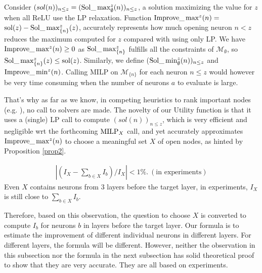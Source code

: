 Consider $(sol(n))_{n \leq z} = (\mathrm{Sol}\_\max_\emptyset^z(n))_{n \leq z}$, a solution maximizing the value for $z$ when all ReLU use the LP relaxation.
Function
$\mathrm{Improve}\_\max^z(n)=$ $\mathrm{sol}(z) - \mathrm{Sol}\_\max_{\{n\}}^z(z)$, 
accurately represents how much opening neuron $n < z$ reduces the maximum computed for $z$
compared with using only LP. 
We have $\mathrm{Improve}\_\max^z(n)\geq 0$ as $\mathrm{Sol}\_\max_{\{n\}}^z$ fulfills all the constraints of 
$\mathcal{M}_\emptyset$, so $\mathrm{Sol}\_\max_{\{n\}}^z(z) \leq \mathrm{sol}(z)$.
Similarly, we define ($\mathrm{Sol}\_\min_\emptyset^z(n))_{n \leq z}$ and 
$\mathrm{Improve}\_\min^z(n)$. Calling MILP on $\mathcal{M}_{\{n\}}$ for each neuron $n \leq z$
would however be very time consuming when the number of neurons $a$ to evaluate is large.
{\color{blue} 
That's why as far as we know, in competing heuristics to rank important nodes (e.g. \cite{huang2017safety,crown}), no call to solvers are made.
The novelty of our Utility function is that it uses a (single) LP call to compute $(sol(n))_{n \leq z}$, which is very efficient and negligible wrt the forthcoming  ${\textrm{MILP}}_X$ call, and yet accurately approximates $\mathrm{Improve}\_\max^z(n)$ to choose a meaningful set $X$ of open nodes, as hinted by Proposition \ref{prop2}.








\iffalse
\begin{align*}
	|(I_X - \sum_{b\in X} I_b)/I_X| < 1\%. \ (\text{in experiments})
\end{align*} Even $X$ contains neurons from 3 layers before the target layer, in experiments, $I_X$ is still close to $\sum_{b\in X} I_b$.

Therefore, based on this observation, the question to choose $X$ is converted to compute $I_b$ for neurons $b$ in layers before the target layer. Our formula is to estimate the improvement of different individual neurons in different layers. For different layers, the formula will be different.  However, neither the observation in this subsection nor the formula in the next subsection has solid theoretical proof to show that they are very accurate. They are all based on experiments. 


}
